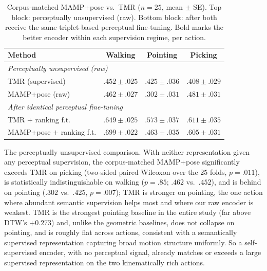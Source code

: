 \documentclass[letterpaper]{article} %
\begin{document}
\begin{table}[h]
\centering
\caption{Corpus-matched MAMP+pose vs.\ TMR ($n=25$, mean $\pm$ SE). Top block: perceptually
unsupervised (raw). Bottom block: after both receive the {same} triplet-based perceptual
fine-tuning. Bold marks the better encoder within each supervision regime, per action.}
\setlength{\tabcolsep}{3pt}
\small
\begin{tabular}{lccc}
\toprule
Method & Walking & Pointing & Picking \\
\midrule
\multicolumn{4}{l}{\emph{Perceptually unsupervised (raw)}} \\
TMR (supervised)     & $.452{\scriptstyle\pm}.025$ & $\mathbf{.425{\scriptstyle\pm}.036}$ & $.408{\scriptstyle\pm}.029$ \\
MAMP+pose (raw)      & $\mathbf{.462{\scriptstyle\pm}.027}$ & $.302{\scriptstyle\pm}.031$ & $\mathbf{.481{\scriptstyle\pm}.031}$ \\
\midrule
\multicolumn{4}{l}{\emph{After identical perceptual fine-tuning}} \\
TMR $+$ ranking f.t.       & $.649{\scriptstyle\pm}.025$ & $\mathbf{.573{\scriptstyle\pm}.037}$ & $\mathbf{.611{\scriptstyle\pm}.035}$ \\
MAMP+pose $+$ ranking f.t. & $\mathbf{.699{\scriptstyle\pm}.022}$ & $.463{\scriptstyle\pm}.035$ & $.605{\scriptstyle\pm}.031$ \\
\bottomrule
\end{tabular}
\end{table}

{The perceptually unsupervised comparison.} With neither representation given any perceptual
supervision, the corpus-matched MAMP+pose significantly exceeds TMR on picking (two-sided paired
Wilcoxon over the $25$ folds, $p{=}.011$), is statistically indistinguishable on walking ($p{=}.85$;
$.462$ vs.\ $.452$), and is behind on pointing ($.302$ vs.\ $.425$, $p{=}.007$); {TMR is stronger
on pointing}, the one action where abundant semantic supervision helps most and where our raw encoder
is weakest. TMR is the strongest pointing baseline in the
entire study (far above DTW's $+0.273$) and, unlike the geometric baselines, does not collapse on
pointing, and is roughly flat across actions, consistent with a semantically supervised representation
capturing broad motion structure uniformly. So a self-supervised encoder, with no perceptual signal,
already matches or exceeds a large supervised representation on the two kinematically rich actions.
\end{document}
